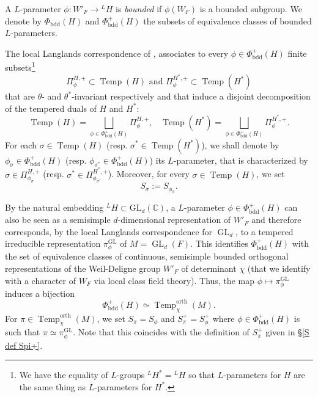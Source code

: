 \documentclass[12pt]{article}
\numberwithin{equation}{section}
\def\bC{\mathbb{C}}
\DeclareMathOperator{\orth}{orth}
\DeclareMathOperator{\Temp}{Temp}
\DeclareMathOperator{\GL}{\mathrm{GL}}
\DeclareMathOperator{\bdd}{\mathrm{bdd}}
\begin{document}
	
	
	A $L$-parameter $\phi: W'_F\to {}^L H$ is {\em bounded} if $\phi(W_F)$ is a bounded subgroup. We denote by $\Phi_{\bdd}(H)$ and $\Phi_{\bdd}^+(H)$ the subsets of equivalence classes of bounded $L$-parameters.
	
	The local Langlands correspondence of \cite{artbook}, \cite{MoeLLC} \cite{MoeReLLC} associates to every $\phi\in \Phi_{\bdd}^+(H)$ finite subsets\footnote{We have the equality of $L$-groups ${}^L H^*={}^L H$ so that $L$-parameters for $H$ are the same thing as $L$-parameters for $H^*$.}
	$$\displaystyle \Pi^{H,+}_\phi\subset \Temp(H) \mbox{ and } \Pi^{H^*,+}_\phi\subset \Temp(H^*)$$
	that are $\theta$- and $\theta^*$-invariant respectively and that induce a disjoint decomposition of the tempered duals of $H$ and $H^*$:
	\begin{equation}\label{disjoint Lpackets}
		\displaystyle \Temp(H)=\bigsqcup_{\phi\in \Phi_{\bdd}^+(H)}  \Pi^{H,+}_\phi,\;\;\; \Temp(H^*)=\bigsqcup_{\phi\in \Phi_{\bdd}^+(H)}  \Pi^{H^*,+}_\phi.
	\end{equation}
	For each $\sigma\in \Temp(H)$ (resp. $\sigma^*\in \Temp(H^*)$), we shall denote by $\phi_\sigma\in \Phi^+_{\bdd}(H)$ (resp. $\phi_{\sigma^*}\in \Phi^+_{\bdd}(H)$) its $L$-parameter, that is characterized by $\sigma\in \Pi^{H,+}_{\phi_\sigma}$ (resp. $\sigma^*\in \Pi^{H^*,+}_{\phi_{\sigma^*}}$). Moreover, for every $\sigma\in \Temp(H)$, we set
	$$\displaystyle S_\sigma:=S_{\phi_\sigma}.$$
	
	By the natural embedding ${}^L H\subset \mathrm{GL}_d(\bC)$, a $L$-parameter $\phi\in \Phi_{\bdd}^+(H)$ can also be seen as a semisimple $d$-dimensional representation of $W'_F$ and therefore corresponds, by the local Langlands correspondence for $\GL_d$, to a tempered irreducible representation $\pi_{\phi}^{\GL}$ of $M=\GL_d(F)$. This identifies $\Phi^+_{\bdd}(H)$ with the set of equivalence classes of continuous, semisimple bounded orthogonal representations of the Weil-Deligne group $W'_F$ of determinant $\chi$ (that we identify with a character of $W_F$ via local class field theory). Thus, the map $\phi\mapsto \pi_\phi^{\GL}$ induces a bijection
	$$\displaystyle \Phi^+_{\bdd}(H)\simeq \Temp^{\orth}_\chi(M).$$
	For $\pi\in \Temp_\chi^{\orth}(M)$, we set $S_\pi=S_\phi$ and $S^+_\pi=S_\phi^+$ where $\phi\in \Phi^+_{\bdd}(H)$ is such that $\pi\simeq \pi_\phi^{\GL}$. Note that this coincides with the definition of $S_\pi^+$ given in \S \ref{S def Spi+}.
	
\end{document}

